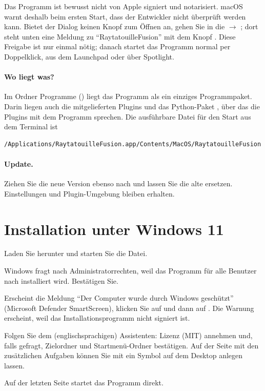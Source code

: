 \begin{hinweis}
Das Programm ist bewusst nicht von Apple signiert und notarisiert. macOS warnt deshalb beim
ersten Start, dass der Entwickler nicht überprüft werden kann. Bietet der Dialog keinen Knopf
zum Öffnen an, gehen Sie in die  $\to$ ; dort steht unten eine Meldung zu \enquote{RaytatouilleFusion} mit dem Knopf
. Diese Freigabe ist nur einmal nötig; danach startet das Programm normal
per Doppelklick, aus dem Launchpad oder über Spotlight.
\end{hinweis}

\paragraph{Wo liegt was?} Im Ordner Programme () liegt das Programm als
ein einziges Programmpaket. Darin liegen auch die mitgelieferten Plugins und das Python-Paket
, über das die Plugins mit dem Programm sprechen. Die ausführbare Datei für den
Start aus dem Terminal ist
\begin{lstlisting}
/Applications/RaytatouilleFusion.app/Contents/MacOS/RaytatouilleFusion
\end{lstlisting}

\paragraph{Update.} Ziehen Sie die neue Version ebenso nach  und lassen
Sie die alte ersetzen. Einstellungen und Plugin-Umgebung bleiben erhalten.

\section{Installation unter Windows 11}\label{sec:inst-windows}

\begin{schritte}
  \item Laden Sie  herunter und starten Sie
    die Datei.
  \item Windows fragt nach Administratorrechten, weil das Programm für alle Benutzer nach
     installiert
    wird. Bestätigen Sie.
  \item Erscheint die Meldung \enquote{Der Computer wurde durch Windows geschützt}
    (Microsoft Defender SmartScreen), klicken Sie auf  und dann auf . Die Warnung erscheint, weil das
    Installationsprogramm nicht signiert ist.
  \item Folgen Sie dem (englischsprachigen) Assistenten: Lizenz (MIT) annehmen und, falls
    gefragt, Zielordner und Startmenü-Ordner bestätigen. Auf der Seite mit den zusätzlichen
    Aufgaben können Sie mit  ein Symbol auf dem Desktop
    anlegen lassen.
  \item Auf der letzten Seite startet  das Programm direkt.
\end{schritte}

